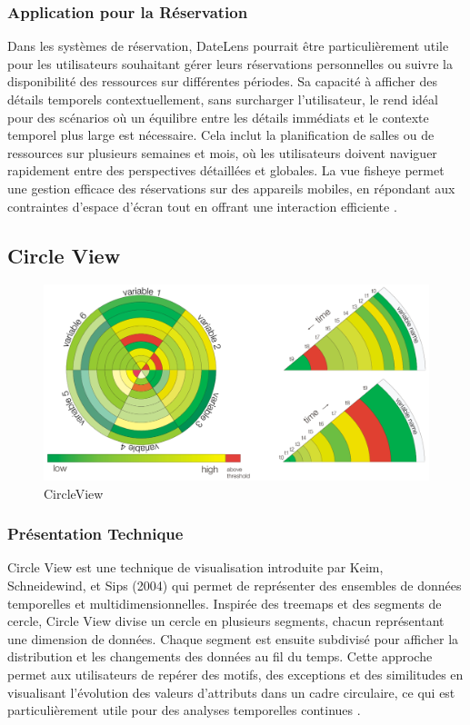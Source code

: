 \documentclass[runningheads]{llncs}
\begin{document}
\subsubsection{Application pour la Réservation}
Dans les systèmes de réservation, DateLens pourrait être particulièrement utile pour les utilisateurs souhaitant gérer leurs réservations personnelles ou suivre la disponibilité des ressources sur différentes périodes. Sa capacité à afficher des détails temporels contextuellement, sans surcharger l’utilisateur, le rend idéal pour des scénarios où un équilibre entre les détails immédiats et le contexte temporel plus large est nécessaire. Cela inclut la planification de salles ou de ressources sur plusieurs semaines et mois, où les utilisateurs doivent naviguer rapidement entre des perspectives détaillées et globales. La vue fisheye permet une gestion efficace des réservations sur des appareils mobiles, en répondant aux contraintes d’espace d’écran tout en offrant une interaction efficiente \cite{bederson_datelens_2004}.


\subsection{Circle View}
\begin{figure}
    \centering
    \includegraphics[width=1\linewidth]{assets/circleview.png}
    \caption{CircleView \cite{keim_circleview_2004}}
    \label{fig:enter-label}
\end{figure}
\subsubsection{Présentation Technique}
Circle View est une technique de visualisation introduite par Keim, Schneidewind, et Sips (2004) qui permet de représenter des ensembles de données temporelles et multidimensionnelles. Inspirée des treemaps et des segments de cercle, Circle View divise un cercle en plusieurs segments, chacun représentant une dimension de données. Chaque segment est ensuite subdivisé pour afficher la distribution et les changements des données au fil du temps. Cette approche permet aux utilisateurs de repérer des motifs, des exceptions et des similitudes en visualisant l'évolution des valeurs d'attributs dans un cadre circulaire, ce qui est particulièrement utile pour des analyses temporelles continues \cite{keim_circleview_2004}.
\end{document}
